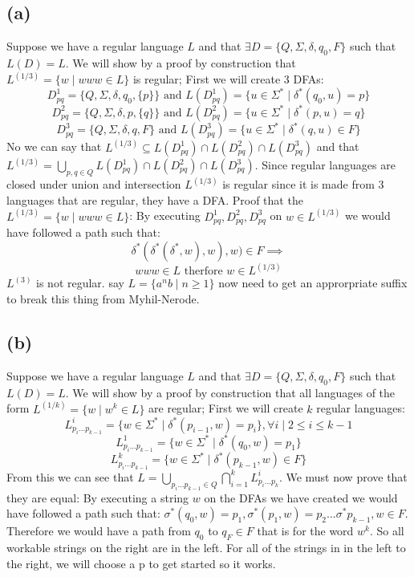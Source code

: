 \documentclass[12pt]{article}
\begin{document}
\subsection*{(a)}
Suppose we have a regular language $L$ and that $\exists
D = \{Q, \Sigma, \delta, q_0, F\}$ such that $L(D) = L$.
We will show by a proof by construction that
$L^{(1/3)} = \{ w \mid www \in L\}$ is regular;
\newline First we will create 3 DFAs:
$$D^1_{pq} = \{Q, \Sigma, \delta, q_0, \{p\}\} \text{ and }
L(D^1_{pq}) = \{u \in \Sigma^* \mid \delta^* (q_0,u) = p\}$$
$$D^2_{pq} = \{Q, \Sigma, \delta, p, \{q\}\} \text{ and }
L(D^2_{pq}) = \{u \in \Sigma^* \mid \delta^* (p,u) = q\}$$
$$D^3_{pq} = \{Q, \Sigma, \delta, q, F\} \text{ and }
L(D^3_{pq}) = \{u \in \Sigma^* \mid \delta^* (q,u) \in F\}$$
No we can say that
$L^{(1/3)} \subseteq L(D^1_{pq}) \cap L(D^2_{pq}) \cap L(D^3_{pq})$ and that
$L^{(1/3)} = \bigcup_{p,q \in Q}
L(D^1_{pq}) \cap L(D^2_{pq}) \cap L(D^3_{pq})$.
Since regular languages are closed under union and intersection
$L^{(1/3)}$ is regular since it is made from 3 languages that are regular,
they have a DFA. \newline
Proof that the $L^{(1/3)} = \{ w \mid www \in L\}$:\newline
By executing  $D^1_{pq} , D^2_{pq} , D^3_{pq}$ on $w \in L^{(1/3)}$
we would have followed a path such that:
$$\delta^*(\delta^*(\delta^*, w), w), w) \in F \implies$$
$$www \in L \text{ therfore }w \in L^{(1/3)}$$
\newline $L^{(3)}$ is not regular. say $L = \{a^nb \mid n \ge 1\}$
now need to get an approrpriate suffix to break this thing from Myhil-Nerode.
\subsection*{(b)}
Suppose we have a regular language $L$ and that $\exists    D = \{Q, \Sigma,
\delta, q_0, F\}$ such that $L(D) = L$.
We will show by a proof by construction that all languages of the form
$L^{(1/k)} = \{ w \mid w^k \in L\}$ are regular;
\newline First we will create $k$ regular languages:
$$L^i_{p_i...p_{k-1}} = \{ w \in \Sigma^* \mid \delta^*(p_{i-1},w) = p_i\},
\forall i \mid 2 \le i \le k-1 $$
$$L^1_{p_i...p_{k-1}} = \{ w \in \Sigma^* \mid \delta^*(q_0,w) = p_1\}$$
$$L^k_{p_i...p_{k-1}} = \{ w \in \Sigma^* \mid \delta^*(p_{k-1},w) \in F\}$$
From this we can see that
$L = \bigcup_{p_i...p_{k-1} \in Q} \bigcap^k_{i=1} L^i_{p_i...p_k}$.
We must now prove that they are equal:
\newline
By executing a string $w$ on the DFAs we have created we would have followed
a path such that:
$\sigma^*(q_0,w) = p_1 , \sigma^*(p_1, w) = p_2 ... \sigma^*{p_{k-1}, w} \in F$.
Therefore we would have a path from $q_0$ to $q_F \in F$ that is for the word
$w^k$. So all workable strings on the right are in the left.
\newline
For all of the strings in in the left to the right,
we will choose a p to get started so it works.
\end{document}
